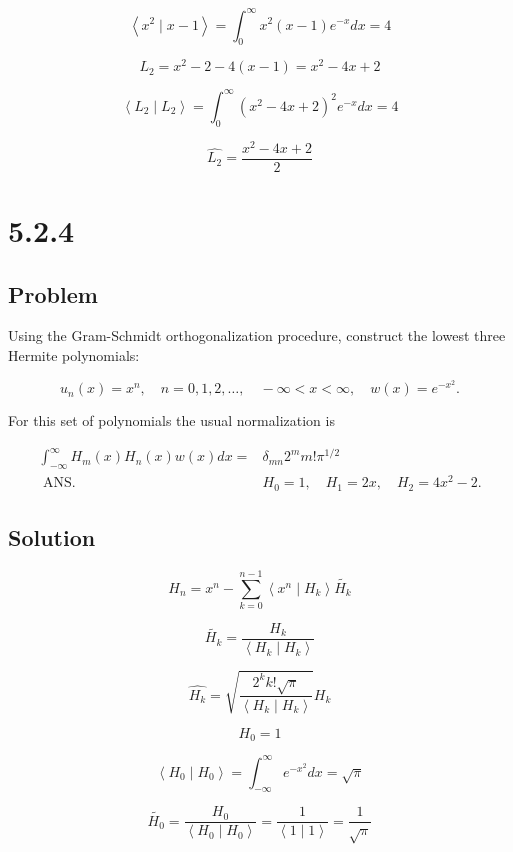 \documentclass[12pt]{article}
\begin{document}
\[
    \left\langle x^2 \mid x-1\right\rangle = \int_0^{\infty} x^2 (x-1) e^{-x} d x = 4
\]

\[
    L_2 = x^2 - 2 - 4 (x-1) = x^2 - 4 x + 2
\]

\[
    \left\langle L_2 \mid L_2\right\rangle = \int_0^{\infty} {(x^2 - 4 x + 2)}^2 e^{-x} d x = 4
\]

\[
    \hat{L_2} = \frac{x^2 - 4 x + 2}{2}
\]

\newpage
\section{5.2.4}

\subsection{Problem}

Using the Gram-Schmidt orthogonalization procedure, construct the lowest three Hermite polynomials:

\[
    u_n(x)=x^n, \quad n=0,1,2, \ldots, \quad-\infty<x<\infty, \quad w(x)=e^{-x^2} .
\]

For this set of polynomials the usual normalization is

\[
    \begin{aligned}
        \int_{-\infty}^{\infty} H_m(x) H_n(x) w(x) d x= & \delta_{m n} 2^m m!\pi^{1 / 2}            \\
        \text { ANS. }                                  & H_0=1, \quad H_1=2 x, \quad H_2=4 x^2-2 .
    \end{aligned}
\]

\subsection{Solution}

\[
    H_n = x^n - \sum_{k=0}^{n-1} \left\langle x^n \mid H_k\right\rangle \tilde{H_k}
\]

\[
    \tilde{H_k} = \frac{H_k}{\left\langle H_k \mid H_k\right\rangle}
\]

\[
    \hat{H_k} = \sqrt{\frac{2^k k! \sqrt{\pi}}{\left\langle H_k \mid H_k\right\rangle}}H_k
\]

\[
    H_0 = 1
\]

\[
    \left\langle H_0 \mid H_0\right\rangle = \int_{-\infty}^{\infty} e^{-x^2} d x = \sqrt{\pi}
\]

\[
    \tilde{H_0} = \frac{H_0}{\left\langle H_0 \mid H_0\right\rangle}  = \frac{1}{\left\langle 1 \mid 1\right\rangle} = \frac{1}{\sqrt{\pi}}
\]
\end{document}
